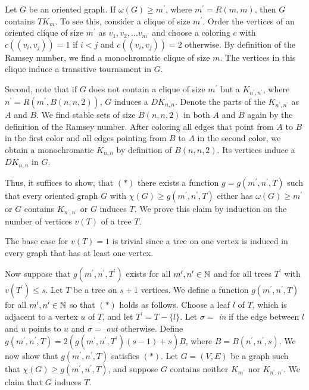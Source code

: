 \begin{prf}
Let $G$ be an oriented graph. If $\omega (G)\geq m^\prime$, where $m^\prime = R(m,m)$, then $G$ contains $TK_m$. To see this, consider a clique of size $m^\prime$. Order the vertices of an oriented clique of size $m^\prime$ as $v_1,v_2,\dots v_{m^\prime}$ and choose a coloring $c$ with $c((v_i,v_j))=1$ if $i<j$ and $c((v_i, v_j))=2$ otherwise. By definition of the Ramsey number, we find a monochromatic clique of size $m$. The vertices in this clique induce a transitive tournament in $G$.

Second, note that if $G$ does not contain a clique of size $m^\prime$ but a $K_{n^\prime , n^\prime}$, where $n^\prime = R(m^\prime , B(n,n,2))$, $G$ induces a $DK_{n,n}$. Denote the parts of the $K_{n^\prime , n^\prime}$ as $A$ and $B$. We find stable sets of size $B(n,n,2)$ in both $A$ and $B$ again by the definition of the Ramsey number. After coloring all edges that point from $A$ to $B$ in the first color and all edges pointing from $B$ to $A$ in the second color, we obtain a monochromatic $K_{n,n}$ by definition of $B(n,n,2)$. Its vertices induce a $DK_{n,n}$ in $G$. 

Thus, it suffices to show, that $(\ast)$ there exists a function $g=g(m^\prime ,n^\prime ,T)$ such that every oriented graph $G$ with $\chi (G)\geq g(m^\prime ,n^\prime ,T)$ either has $\omega (G)\geq m^\prime$ or $G$ contains $K_{n^\prime ,n^\prime }$ or $G$ induces $T$. We prove this claim by induction on the number of vertices $v(T)$ of a tree $T$. 

The base case for $v(T)=1$ is trivial since a tree on one vertex is induced in every graph that has at least one vertex. 

Now suppose that $g(m^\prime ,n^\prime ,T^\prime )$ exists for all $m^\prime ,n^\prime \in\mathbb{N}$ and for all trees $T^\prime$ with $v(T^\prime )\leq s$. Let $T$ be a tree on $s+1$ vertices. We define a function $g(m^\prime ,n^\prime ,T)$ for all $m^\prime ,n^\prime\in\mathbb{N}$ so that $(\ast)$ holds as follows. Choose a leaf $l$ of $T$, which is adjacent to a vertex $u$ of $T$, and let $T^\prime = T- \{l\}$. Let $\sigma =$ \textit{in} if the edge between $l$ and $u$ points to $u$ and $\sigma = $ \textit{out} otherwise. Define $g(m^\prime ,n^\prime ,T) = 2(g(m^\prime ,n^\prime ,T^\prime )(s-1)+s)B$, where $B=B(n^\prime ,n^\prime ,s)$. We now show that $g(m^\prime ,n^\prime ,T)$ satisfies $(\ast)$. Let $G=(V,E)$ be a graph such that $\chi (G)\geq g(m^\prime ,n^\prime ,T)$, and suppose $G$ contains neither $K_{m^\prime}$ nor $K_{n^\prime ,n^\prime}$. We claim that $G$ induces $T$.


\end{prf}
